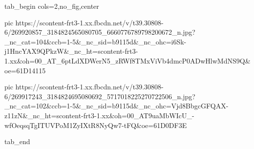  
 
 
 
 

\ifcmt
  tab_begin cols=2,no_fig,center

     pic https://scontent-frt3-1.xx.fbcdn.net/v/t39.30808-6/269920857_3184824565080705_6660776789798200672_n.jpg?_nc_cat=104&ccb=1-5&_nc_sid=b9115d&_nc_ohc=i6Sk-j1HncYAX9QPkzW&_nc_ht=scontent-frt3-1.xx&oh=00_AT_6ptLdXDWerN5_zRWf8TMxViVb4dmcP0ADwHlwMdNS9Q&oe=61D14115

     pic https://scontent-frt3-1.xx.fbcdn.net/v/t39.30808-6/269917243_3184824695080692_5717018225270722506_n.jpg?_nc_cat=102&ccb=1-5&_nc_sid=b9115d&_nc_ohc=Vjd8BbgcGFQAX-z11zN&_nc_ht=scontent-frt3-1.xx&oh=00_AT9uaMbWIcU_-wfOeqsqTgITUVPoM1ZyIXtR8NyQw7-tFQ&oe=61D0DF3E

  tab_end
\fi
